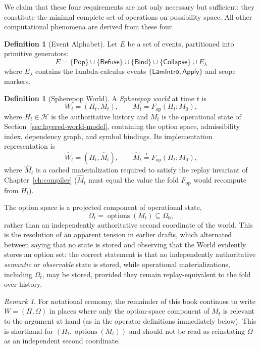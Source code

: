 \documentclass[12pt, a4paper, openany]{book}
\theoremstyle{plain}
\theoremstyle{definition}
\newtheorem{definition}[theorem]{Definition}
\theoremstyle{remark}
\newtheorem{remark}[theorem]{Remark}
\newcommand{\Pop}{\mathsf{Pop}}
\newcommand{\Refuse}{\mathsf{Refuse}}
\newcommand{\Bind}{\mathsf{Bind}}
\newcommand{\Collapse}{\mathsf{Collapse}}
\newcommand{\calH}{\mathcal{H}}
\begin{document}
We claim that these four requirements are not only necessary but sufficient: they
constitute the minimal complete set of operations on possibility space. All other
computational phenomena are derived from these four.

\begin{definition}[Event Alphabet]
Let $E$ be a set of events, partitioned into primitive generators:
\[
E = \{\Pop\} \cup \{\Refuse\} \cup \{\Bind\} \cup \{\Collapse\} \cup E_\lambda
\]
where $E_\lambda$ contains the lambda-calculus events $\{\mathsf{LamIntro},
\mathsf{Apply}\}$ and scope markers.
\end{definition}

\begin{definition}[Spherepop World]
\label{sec:spherepop-world}
A \emph{Spherepop world} at time $t$ is
\[
W_t = (H_t, M_t), \qquad M_t = F_{\mathrm{op}}(H_t; M_0),
\]
where $H_t \in \calH$ is the authoritative history and $M_t$ is the operational
state of Section~\ref{sec:layered-world-model}, containing the option space,
admissibility index, dependency graph, and symbol bindings. Its implementation
representation is
\[
\widehat W_t = (H_t, \widehat M_t), \qquad \widehat M_t \overset{!}{=} F_{\mathrm{op}}(H_t; M_0),
\]
where $\widehat M_t$ is a cached materialization required to satisfy the replay
invariant of Chapter~\ref{ch:compiler} ($\widehat M_t$ must equal the value the
fold $F_{\mathrm{op}}$ would recompute from $H_t$).

The option space is a projected component of operational state,
\[
\Omega_t = \operatorname{options}(M_t) \subseteq \Omega_0,
\]
rather than an independently authoritative second coordinate of the world. This
is the resolution of an apparent tension in earlier drafts, which alternated
between saying that no state is stored and observing that the World evidently
stores an option set: the correct statement is that no independently
authoritative \emph{semantic} or \emph{observable} state is stored, while
operational materializations, including $\Omega_t$, may be stored, provided
they remain replay-equivalent to the fold over history.

\begin{remark}
For notational economy, the remainder of this book continues to write $W =
(H, \Omega)$ in places where only the option-space component of $M_t$ is
relevant to the argument at hand (as in the operator definitions immediately
below). This is shorthand for $(H_t, \operatorname{options}(M_t))$ and should
not be read as reinstating $\Omega$ as an independent second coordinate.
\end{remark}
\end{definition}
\end{document}
